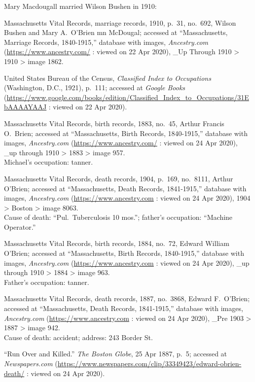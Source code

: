\begin{thebibliography}{999}
	Mary Macdougall married Wilson Bushen in 1910:
	
	Massachusetts Vital Records, marriage records, 1910, p.\ 31, no.\ 692, Wilson Bushen and Mary A.\ O'Brien mn McDougal; accessed at ``Massachusetts, Marriage Records, 1840-1915,'' database with images, \textit{Ancestry.com} (\url{https://www.ancestry.com/} : viewed on 22 Apr 2020), \_Up Through 1910 > 1910 > image 1862.
	
	United States Bureau of the Census, \textit{Classified Index to Occupations} (Washington, D.C., 1921), p.\ 111; accessed at \textit{Google Books} (\url{https://www.google.com/books/edition/Classified_Index_to_Occupations/31EbAAAAYAAJ} : viewed on 22 Apr 2020).
	
	Massachusetts Vital Records, birth records, 1883, no.\ 45, Arthur Francis O.\ Brien; accessed at ``Massachusetts, Birth Records, 1840-1915,'' database with images, \textit{Ancestry.com} (\url{https://www.ancestry.com/} : viewed on 24 Apr 2020), \_up through 1910 > 1883 > image 957.\\
	Michael's occupation: tanner.
	
	Massachusetts Vital Records, death records, 1904, p.\ 169, no.\ 8111, Arthur O'Brien; accessed at ``Massachusetts, Death Records, 1841-1915,'' database with images, \textit{Ancestry.com} (\url{https://www.ancestry.com} : viewed on 24 Apr 2020), 1904 > Boston > image 8063.\\
	Cause of death: ``Pul.\ Tuberculosis 10 mos.''; father's occupation: ``Machine Operator.''
	
	Massachusetts Vital Records, birth records, 1884, no.\ 72, Edward William O'Brien; accessed at ``Massachusetts, Birth Records, 1840-1915,'' database with images, \textit{Ancestry.com} (\url{https://www.ancestry.com} : viewed on 24 Apr 2020), \_up through 1910 > 1884 > image 963.\\
	Father's occupation: tanner.
	
	Massachusetts Vital Records, death records, 1887, no.\ 3868, Edward F.\ O'Brien; accessed at ``Massachusetts, Death Records, 1841-1915,'' database with images, \textit{Ancestry.com} (\url{https://www.ancestry.com} : viewed on 24 Apr 2020), \_Pre 1903 > 1887 > image 942.\\
	Cause of death: accident; address: 243 Border St.
	
	``Run Over and Killed.'' \textit{The Boston Globe}, 25 Apr 1887, p.\ 5; accessed at \textit{Newspapers.com} (\url{https://www.newspapers.com/clip/33349423/edward-obrien-death/} : viewed on 24 Apr 2020).
	

\end{thebibliography}
